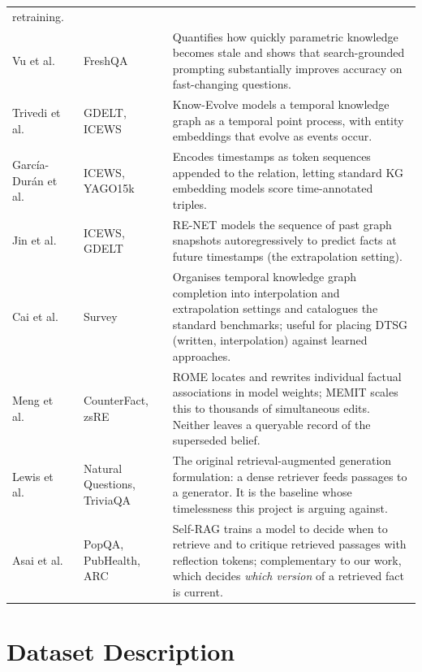 \documentclass[11pt,a4paper]{article}
\begin{document}
\begin{table}[htbp]
\begin{tabularx}{\textwidth}{p{2.6cm} p{3.2cm} X}
retraining.\\
\addlinespace
Vu et al.~\cite{vu2023freshllms} & FreshQA &
Quantifies how quickly parametric knowledge becomes stale and shows that
search-grounded prompting substantially improves accuracy on fast-changing
questions.\\
\addlinespace
Trivedi et al.~\cite{trivedi2017knowevolve} & GDELT, ICEWS &
Know-Evolve models a temporal knowledge graph as a temporal point process, with
entity embeddings that evolve as events occur.\\
\addlinespace
Garc\'ia-Dur\'an et al.~\cite{garciaduran2018learning} & ICEWS, YAGO15k &
Encodes timestamps as token sequences appended to the relation, letting
standard KG embedding models score time-annotated triples.\\
\addlinespace
Jin et al.~\cite{jin2020renet} & ICEWS, GDELT &
RE-NET models the sequence of past graph snapshots autoregressively to predict
facts at future timestamps (the extrapolation setting).\\
\addlinespace
Cai et al.~\cite{cai2023tkgsurvey} & Survey &
Organises temporal knowledge graph completion into interpolation and
extrapolation settings and catalogues the standard benchmarks; useful for
placing DTSG (written, interpolation) against learned approaches.\\
\addlinespace
Meng et al.~\cite{meng2022rome,meng2023memit} & CounterFact, zsRE &
ROME locates and rewrites individual factual associations in model weights;
MEMIT scales this to thousands of simultaneous edits. Neither leaves a
queryable record of the superseded belief.\\
\addlinespace
Lewis et al.~\cite{lewis2020rag} & Natural Questions, TriviaQA &
The original retrieval-augmented generation formulation: a dense retriever
feeds passages to a generator. It is the baseline whose timelessness this
project is arguing against.\\
\addlinespace
Asai et al.~\cite{asai2024selfrag} & PopQA, PubHealth, ARC &
Self-RAG trains a model to decide when to retrieve and to critique retrieved
passages with reflection tokens; complementary to our work, which decides
\emph{which version} of a retrieved fact is current.\\
\bottomrule
\end{tabularx}
\end{table}

\clearpage
\section{Dataset Description}
\label{sec:dataset}
\end{document}
